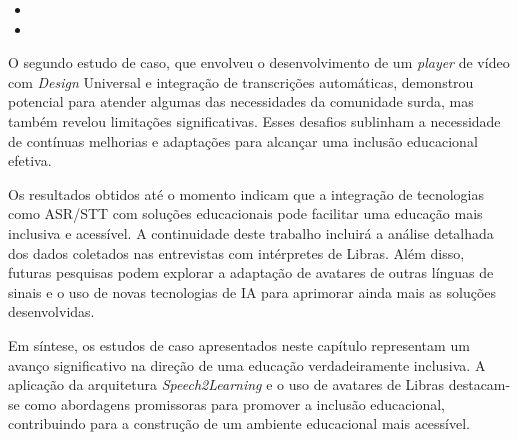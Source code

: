 \begin{itemize}
    \item {}

    \item {}
\end{itemize}

O segundo estudo de caso, que envolveu o desenvolvimento de um \textit{player} de vídeo com \textit{Design} Universal e integração de transcrições automáticas, demonstrou potencial para atender algumas das necessidades da comunidade surda, mas também revelou limitações significativas. Esses desafios sublinham a necessidade de contínuas melhorias e adaptações para alcançar uma inclusão educacional efetiva.

Os resultados obtidos até o momento indicam que a integração de tecnologias como ASR/STT com soluções educacionais pode facilitar uma educação mais inclusiva e acessível. A continuidade deste trabalho incluirá a análise detalhada dos dados coletados nas entrevistas com intérpretes de Libras. Além disso, futuras pesquisas podem explorar a adaptação de avatares de outras línguas de sinais e o uso de novas tecnologias de IA para aprimorar ainda mais as soluções desenvolvidas.

Em síntese, os estudos de caso apresentados neste capítulo representam um avanço significativo na direção de uma educação verdadeiramente inclusiva. A aplicação da arquitetura \textit{Speech2Learning} e o uso de avatares de Libras destacam-se como abordagens promissoras para promover a inclusão educacional, contribuindo para a construção de um ambiente educacional mais acessível.
